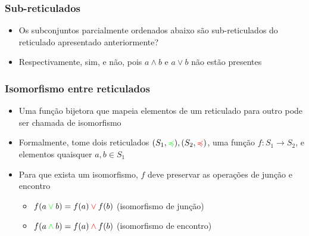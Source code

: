 \documentclass[12pt]{beamer}
\begin{document}
\begin{frame}
  \frametitle{Sub-reticulados}
  \begin{itemize}
    \item Os subconjuntos parcialmente ordenados abaixo são sub-reticulados do
        reticulado apresentado anteriormente?
    \begin{figure}
    \end{figure}
    \item Respectivamente, sim, e não, pois $a \wedge b$ e $a \vee b$ não estão
        presentes
  \end{itemize}
\end{frame}

\begin{frame}
  \frametitle{Isomorfismo entre reticulados}
  \begin{itemize}
    \item<1-> Uma função bijetora que mapeia elementos de um reticulado para
        outro pode ser chamada de isomorfismo
    \item<2-> Formalmente, tome dois reticulados $(S_{1},
        \textcolor{green}{\preccurlyeq}), (S_{2},
          \textcolor{red}{\preccurlyeq})$, uma função $f : S_{1} \rightarrow
          S_{2}$, e elementos quaisquer $a, b \in S_{1}$
    \item<3-> Para que exista um isomorfismo, $f$ deve preservar as operações
        de junção e encontro
    \begin{itemize}[itemsep=0pt]
      \item<4-> $f(a \mathbin{\textcolor{green}{\vee}} b) = f(a)
          \mathbin{\textcolor{red}{\vee}} f(b)$ (isomorfismo de junção)
      \item<5-> $f(a \mathbin{\textcolor{green}{\wedge}} b) = f(a)
          \mathbin{\textcolor{red}{\wedge}} f(b)$ (isomorfismo de encontro)
    \end{itemize}
  \end{itemize}
\end{frame}
\end{document}
